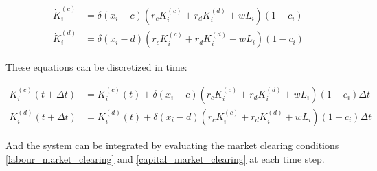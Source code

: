 \begin{align}
	\dot{K}_i^{(c)} &= \delta(x_i-c)(r_c K_i^{(c)} + r_d K_i^{(d)} + wL_i)(1 -c_i) \\
	\dot{K}_i^{(d)} &= \delta(x_i-d)(r_c K_i^{(c)} + r_d K_i^{(d)} + wL_i)(1 -c_i)
	\label{household_capital_dynamics}
\end{align}

These equations can be discretized in time:

\begin{align}
	K_i^{(c)}(t + \Delta t) &= K_{i}^{(c)}(t) + \delta(x_i-c)(r_c K_i^{(c)} + r_d K_i^{(d)} + wL_i)(1 -c_i)\Delta t \\
	K_i^{(d)}(t + \Delta t) &= K_{i}^{(d)}(t) + \delta(x_i-d)(r_c K_i^{(c)} + r_d K_i^{(d)} + wL_i)(1 -c_i)\Delta t
	\label{household_capital_dynamics_discretized}
\end{align}

And the system can be integrated by evaluating the market clearing conditions \eqref{labour_market_clearing} and \eqref{capital_market_clearing} at each time step.

{}
    
